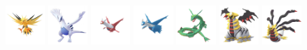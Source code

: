 \documentclass[12pt]{beamer}
\begin{document}
\begin{frame}
\begin{footnotesize}
\begin{block}{}
\begin{center}
    \includegraphics[width=1.5cm]{../../images/pokemon/zapdos.png}
    \includegraphics[width=1.5cm]{../../images/pokemon/lugia.png}
    \includegraphics[width=1.5cm]{../../images/pokemon/latias.png}
    \includegraphics[width=1.5cm]{../../images/pokemon/latios.png}
    \includegraphics[width=1.5cm]{../../images/pokemon/rayquaza.png}
    \includegraphics[width=1.5cm]{../../images/pokemon/giratina_a.png}
    \includegraphics[width=1.5cm]{../../images/pokemon/giratina_o.png}
\end{center}
\end{block}

\end{footnotesize}
\end{frame}

\end{document}
